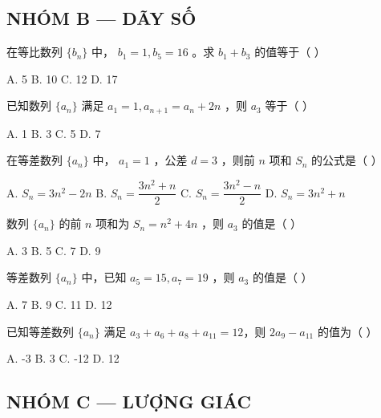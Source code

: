 \documentclass[11pt, a4paper]{article}
\begin{document}
\subsection*{NHÓM B — DÃY SỐ}

\begin{baitap}[13]
在等比数列 $\{b_n\}$ 中， $b_1 = 1, b_5 = 16$ 。求 $b_1 + b_3$ 的值等于（ ）
\par\vspace{3pt}
\noindent A. 5 \quad B. 10 \quad C. 12 \quad D. 17
\end{baitap}

\begin{baitap}[14]
已知数列 $\{a_n\}$ 满足 $a_1 = 1, a_{n+1} = a_n + 2n$ ，则 $a_3$ 等于（ ）
\par\vspace{3pt}
\noindent A. 1 \quad B. 3 \quad C. 5 \quad D. 7
\end{baitap}

\begin{baitap}[15]
在等差数列 $\{a_n\}$ 中， $a_1 = 1$ ，公差 $d = 3$ ，则前 $n$ 项和 $S_n$ 的公式是（ ）
\par\vspace{3pt}
\noindent A. $S_n = 3n^2 - 2n$ \quad B. $S_n = \dfrac{3n^2 + n}{2}$ \quad C. $S_n = \dfrac{3n^2 - n}{2}$ \quad D. $S_n = 3n^2 + n$
\end{baitap}

\begin{baitap}[16]
数列 $\{a_n\}$ 的前 $n$ 项和为 $S_n = n^2 + 4n$ ，则 $a_3$ 的值是（ ）
\par\vspace{3pt}
\noindent A. 3 \quad B. 5 \quad C. 7 \quad D. 9
\end{baitap}

\begin{baitap}[17]
等差数列 $\{a_n\}$ 中，已知 $a_5 = 15, a_7 = 19$ ，则 $a_3$ 的值是（ ）
\par\vspace{3pt}
\noindent A. 7 \quad B. 9 \quad C. 11 \quad D. 12
\end{baitap}

\begin{baitap}[18]
已知等差数列 $\{a_n\}$ 满足 $a_3 + a_6 + a_8 + a_{11} = 12$，则 $2a_9 - a_{11}$ 的值为（ ）
\par\vspace{3pt}
\noindent A. -3 \quad B. 3 \quad C. -12 \quad D. 12
\end{baitap}

\subsection*{NHÓM C — LƯỢNG GIÁC}
\end{document}
